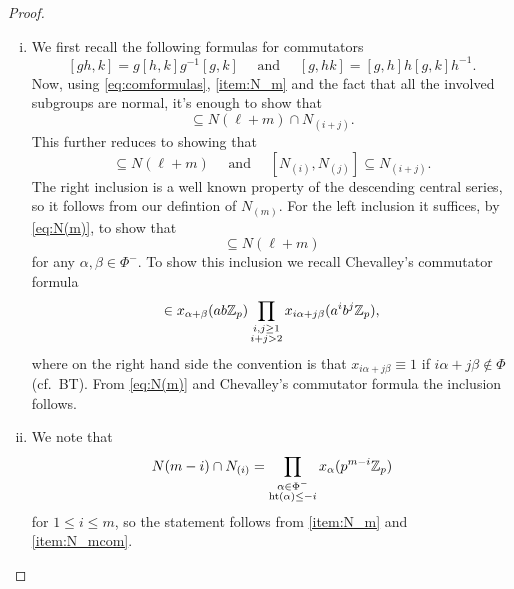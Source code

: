 \begin{proof}
\begin{enumerate}[(i),wide]
  \item We first recall the following formulas for commutators
    \begin{equation}\label{eq:comformulas}
      [gh,k] = g[h,k]g^{-1}[g,k] \quad \text{ and } \quad [g,hk] = [g,h]h[g,k]h^{-1}.
    \end{equation}
    Now, using \eqref{eq:comformulas}, \ref{item:N_m} and the fact that all the involved subgroups are normal, it's enough to show that
    \begin{equation*}
      [N(\ell) \cap N_{(i)}, N(m) \cap N_{(j)}] \subseteq N(\ell+m) \cap N_{(i+j)}.
    \end{equation*}
    This further reduces to showing that
    \begin{equation*}
      [N(\ell),N(m)] \subseteq N(\ell+m) \quad \text{ and } \quad [N_{(i)},N_{(j)}] \subseteq N_{(i+j)}.
    \end{equation*}
    The right inclusion is a well known property of the descending central series, so it follows from our defintion of $N_{(m)}$. For the left inclusion it suffices, by \eqref{eq:N(m)}, to show that
    \begin{equation*}
      [x_\alpha(p^\ell \Z_p), x_\beta(p^m \Z_p)] \subseteq N(\ell + m)
    \end{equation*}
    for any $\alpha,\beta \in \Phi^{-}$. To show this inclusion we recall Chevalley's commutator formula
    \begin{equation*}
      [x_\alpha(a),x_\beta(b)] \in x_{\alpha+\beta}(ab\Z_p) \prod_{\substack{i,j \geq 1 \\ i+j > 2}} x_{i\alpha + j\beta}(a^{i}b^{j}\Z_p),
    \end{equation*}
    where on the right hand side the convention is that $x_{i\alpha + j\beta} \equiv 1$ if $i\alpha + j\beta \notin \Phi$ (cf.\ BT). From \eqref{eq:N(m)} and Chevalley's commutator formula the inclusion follows.

  \item We note that
    \begin{equation*}
      N(m-i) \cap N_{(i)} = \prod_{\substack{\alpha \in \Phi^{-} \\ \operatorname{ht}(\alpha) \leq -i}} x_\alpha(p^{m-i} \mathbb{Z}_p)
    \end{equation*}
    for $1 \leq i \leq m$, so the statement follows from \ref{item:N_m} and \ref{item:N_mcom}.


\end{enumerate}
\end{proof}

